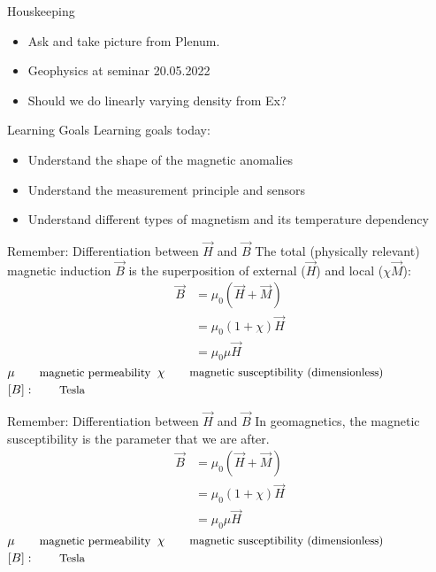 \begin{frame}
  \begin{PointSix}{Houskeeping}
    \begin{itemize}
      \item \alert{Ask and take picture from Plenum.}
      \item \alert{Geophysics at seminar 20.05.2022}
      \item \alert{Should we do linearly varying density from Ex?}
    \end{itemize}
  \end{PointSix}
\end{frame}


\begin{frame}
    \begin{PointSix}{Learning Goals}
      \alert{Learning goals today:}
      \begin{itemize}
        \item Understand the shape of the magnetic anomalies
        \item Understand the measurement principle and sensors
        \item Understand different types of magnetism and its temperature dependency
      \end{itemize}
    \end{PointSix}
\end{frame}

\begin{frame}
  \begin{PointSix}{Remember: Differentiation between $\vec{H}$ and $\vec{B}$}
  The total (physically relevant) magnetic induction $\vec{B}$ is the superposition of external ($\vec{H}$) and local ($\chi \vec{M}$):
  \begin{align*}
    \vec{B} &= \mu_0\left(\vec{H} + \vec{M} \right)\\
            &= \mu_0 (1 + \chi) \vec{H} \\
            &= \mu_0 \mu \vec{H}
  \end{align*}
  $\mu \qquad \text{\small magnetic permeability}$
  $\chi \qquad \text{\small magnetic susceptibility (dimensionless)}$
  $[B]: \qquad \text{\small Tesla}$
  \end{PointSix}
\end{frame}

\begin{frame}
  \begin{PointSix}{Remember: Differentiation between $\vec{H}$ and $\vec{B}$}
  \alert{In geomagnetics, the magnetic susceptibility is the parameter that we are after.}
  \begin{align*}
    \vec{B} &= \mu_0\left(\vec{H} + \vec{M} \right)\\
            &= \mu_0 (1 + \chi) \vec{H} \\
            &= \mu_0 \mu \vec{H}
  \end{align*}
  $\mu \qquad \text{\small magnetic permeability}$
  $\chi \qquad \text{\small magnetic susceptibility (dimensionless)}$
  $[B]: \qquad \text{\small Tesla}$
  \end{PointSix}
\end{frame}

